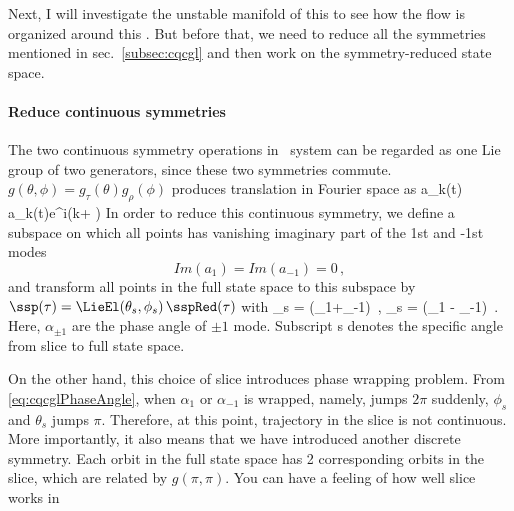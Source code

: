 Next, I will investigate the unstable manifold of this {\reqv} to
see how the flow is organized around this \reqv. But before that,
we need to reduce all the symmetries mentioned in sec.~\ref{subsec:cqcgl}
and then work on the symmetry-reduced state space.

\paragraph{Reduce continuous symmetries} The two continuous symmetry
operations in
\cqcGL\ system can be regarded as one Lie group of two generators, since
these two symmetries commute.
$g(\theta,\phi) = g_\tau(\theta)g_\rho(\phi)$ produces translation in
Fourier space as
\beq
a_k(t) \to a_k(t)e^{i(k\theta + \phi)}
In order to reduce this continuous symmetry,
we define a subspace on which all points has vanishing imaginary part
of the 1st and -1st modes
\[
Im(a_1) = Im(a_{-1}) = 0
\,,
\]
and transform all points in the full state space to
this subspace by $ \ssp(\tau) = \LieEl(\theta_s, \phi_s) \, \sspRed(\tau)$
with
\beq
\phi_s = (\alpha_{1}+\alpha_{-1}) \,, \quad
\theta_s = (\alpha_{1} - \alpha_{-1}) \,.
Here, $\alpha_{\pm 1}$ are the phase angle of $\pm 1$ mode.
Subscript s denotes the specific angle from slice to full state space.

On the other hand, this choice of slice introduces phase wrapping
problem. From \eqref{eq:cqcglPhaseAngle}, when $\alpha_1$ or
$\alpha_{-1}$ is wrapped, namely, jumps $2\pi$ suddenly, $\phi_s$ and
$\theta_s$ jumps $\pi$. Therefore, at this point, trajectory in the
slice is not continuous. More importantly, it also means that we have
introduced another discrete symmetry. Each orbit in the full state space
has 2 corresponding orbits in the slice, which are related by
$g(\pi, \pi)$. You can have a feeling of how well
slice works in 

